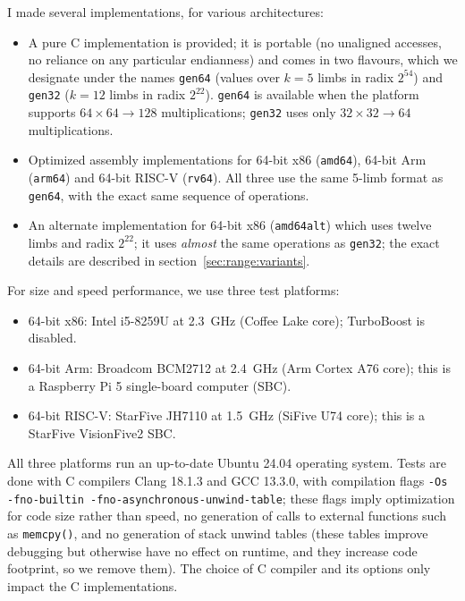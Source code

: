 \documentclass{llncs}
\begin{document}
I made several implementations, for various architectures:
\begin{itemize}

    \item A pure C implementation is provided; it is portable (no
    unaligned accesses, no reliance on any particular endianness)
    and comes in two flavours, which we designate under the names
    \verb+gen64+ (values over $k = 5$ limbs in radix $2^{54}$)
    and \verb+gen32+ ($k = 12$ limbs in radix $2^{22}$). \verb+gen64+
    is available when the platform supports $64\times 64\rightarrow 128$
    multiplications; \verb+gen32+ uses only $32\times 32\rightarrow 64$
    multiplications.

    \item Optimized assembly implementations for 64-bit x86
    (\verb+amd64+), 64-bit Arm (\verb+arm64+) and 64-bit RISC-V
    (\verb+rv64+). All three use the same 5-limb format as \verb+gen64+,
    with the exact same sequence of operations.

    \item An alternate implementation for 64-bit x86 (\verb+amd64alt+)
    which uses twelve limbs and radix $2^{22}$; it uses \emph{almost}
    the same operations as \verb+gen32+; the exact details are described
    in section~\ref{sec:range:variants}.

\end{itemize}

For size and speed performance, we use three test platforms:
\begin{itemize}

    \item 64-bit x86: Intel i5-8259U at 2.3~GHz (Coffee Lake core);
    TurboBoost is disabled.

    \item 64-bit Arm: Broadcom BCM2712 at 2.4~GHz (Arm Cortex A76 core);
    this is a Raspberry Pi 5 single-board computer (SBC).

    \item 64-bit RISC-V: StarFive JH7110 at 1.5~GHz (SiFive U74 core);
    this is a StarFive VisionFive2 SBC.

\end{itemize}
All three platforms run an up-to-date Ubuntu 24.04 operating system.
Tests are done with C compilers Clang 18.1.3 and GCC 13.3.0, with
compilation flags \texttt{-Os -fno-builtin
-\nobreak fno-asynchronous-unwind-table}; these flags imply optimization
for code size rather than speed, no generation of calls to external
functions such as \verb+memcpy()+, and no generation of stack unwind
tables (these tables improve debugging but otherwise have no effect on
runtime, and they increase code footprint, so we remove them). The
choice of C compiler and its options only impact the C implementations.
\end{document}
